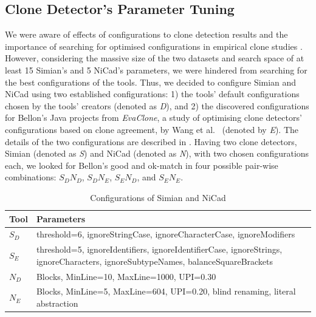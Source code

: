 \documentclass{sig-alternate-05-2015}
\begin{document}
\subsection{Clone Detector's Parameter Tuning}
We were aware of effects of configurations to clone detection results and the importance of searching for optimised configurations in empirical clone studies \cite{Wang2014,cr2016ssbse,Ragkhitwetsagul2016,Svajlenko2014}. However, considering the massive size of the two datasets and search space of at least 15 Simian's and 5 NiCad's parameters, we were hindered from searching for the best configurations of the tools. Thus, we decided to configure Simian and NiCad using two established configurations: 1) the tools' default configurations chosen by the tools' creators (denoted as \textit{D}), and 2) the discovered configurations for Bellon's Java projects from \textit{EvaClone}, a study of optimising clone detectors' configurations based on clone agreement, by Wang et al.~\cite{Wang2013} (denoted by \textit{E}). The details of the two configurations are described in . Having two clone detectors, Simian (denoted as \textit{S}) and NiCad (denoted as \textit{N}), with two chosen configurations each, we looked for Bellon's good and ok-match in four possible pair-wise combinations: $S_{D}N_{D}$, $S_{D}N_{E}$, $S_{E}N_{D}$, and $S_{E}N_{E}$.

\begin{table}
	\centering
	\caption{Configurations of Simian and NiCad}
	\label{t:param_tuning}
	\small
	\begin{tabular}{l|p{7cm}}
		\hline 
		Tool & Parameters \\
		\hline
		$S_D$ &  threshold=6, ignoreStringCase, \newline ignoreCharacterCase, ignoreModifiers \\ 
		\hline
		$S_E$ & threshold=5, ignoreIdentifiers, \newline ignoreIdentifierCase, ignoreStrings, \newline ignoreCharacters, ignoreSubtypeNames, \newline balanceSquareBrackets  \\ 
		\hline 
		$N_D$ & Blocks, MinLine=10, MaxLine=1000, UPI=0.30 \\
		\hline
		$N_E$ & Blocks, MinLine=5, MaxLine=604, UPI=0.20, \newline blind renaming, literal abstraction \\ 
		\hline 
	\end{tabular} %
\end{table}
\end{document}
